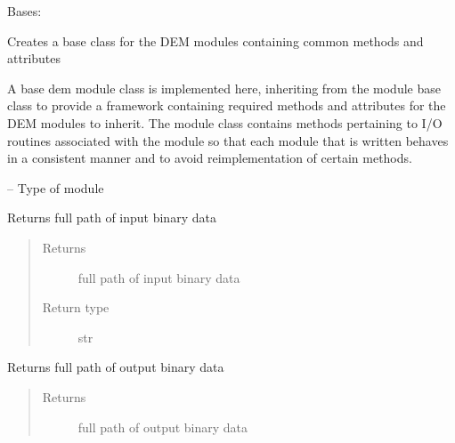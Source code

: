 \documentclass[letterpaper,10pt,english]{sphinxmanual}
\begin{document}
\begin{fulllineitems}
\label{\detokenize{MouseReferenceManual:Modules.Base.DemModuleBaseClass}}
Bases: {\hyperref[\detokenize{MouseReferenceManual:Modules.Base.ModuleBaseClass}]{}}

Creates a base class for the DEM modules containing common methods and attributes

A base dem module class is implemented here, inheriting from the module base class to provide a framework containing required methods and attributes for the DEM modules to inherit. The module class contains methods pertaining to I/O routines associated with the module so that each module that is written behaves in a consistent manner and to avoid reimplementation of certain methods.

\begin{fulllineitems}
\label{\detokenize{MouseReferenceManual:Modules.Base.DemModuleBaseClass.type}}
 -- Type of module

\end{fulllineitems}


\begin{fulllineitems}
\label{\detokenize{MouseReferenceManual:Modules.Base.DemModuleBaseClass.inputFileName}}
Returns full path of input binary data
\begin{quote}\begin{description}
\item[{Returns}] \leavevmode
full path of input binary data

\item[{Return type}] \leavevmode
str

\end{description}\end{quote}

\end{fulllineitems}


\begin{fulllineitems}
\label{\detokenize{MouseReferenceManual:Modules.Base.DemModuleBaseClass.outputFileName}}
Returns full path of output binary data
\begin{quote}\begin{description}
\item[{Returns}] \leavevmode
full path of output binary data


\end{description}
\end{quote}
\end{fulllineitems}
\end{fulllineitems}
\end{document}
